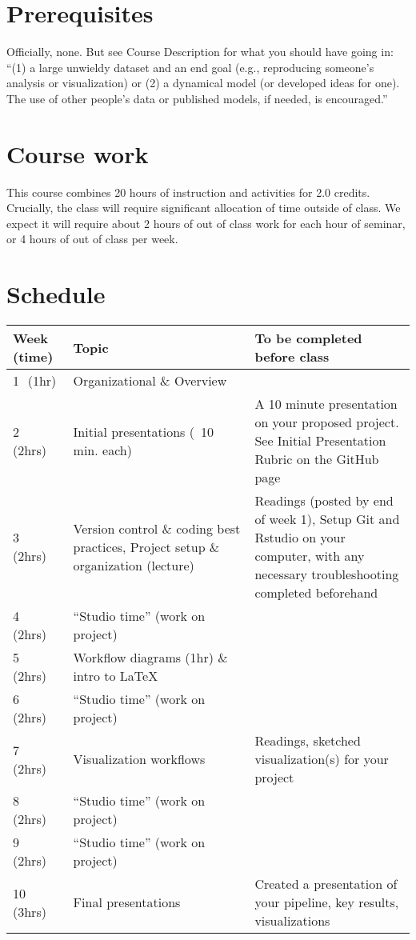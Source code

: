 \documentclass[]{article}
\begin{document}
\section*{Prerequisites}
	Officially, none. But see Course Description for what you should have going in: “(1) a large unwieldy dataset and an end goal (e.g., reproducing someone's analysis or visualization) or (2) a dynamical model (or developed ideas for one). The use of other people's data or published models, if needed, is encouraged.”

\section*{Course work}
	This course combines 20 hours of instruction and activities for 2.0 credits. Crucially, the class will require significant allocation of time outside of class. We expect it will require about 2 hours of out of class work for each hour of seminar, or 4 hours of out of class per week.
	
\section*{Schedule}

\begin{tabular}{p{0.15\linewidth}p{0.45\linewidth}p{0.4\linewidth}} \hline
	Week (time) & Topic & To be completed before class\\ \hline
	
	1  (1hr) & Organizational \& Overview \\
	
	2  (2hrs) &Initial presentations (~10 min. each) & A 10 minute presentation on your proposed project.  See Initial Presentation Rubric on the GitHub page \\
	
	3  (2hrs) & Version control \& coding best practices, Project setup \& organization (lecture) & Readings (posted by end of week 1), Setup Git and Rstudio on your computer, with any necessary troubleshooting completed beforehand \\
	
	4  (2hrs) & ``Studio time'' (work on project) \\
	
	5  (2hrs) & Workflow diagrams (1hr) \&  intro to \LaTeX  \\
	
	6  (2hrs) & ``Studio time'' (work on project) \\
	
	7  (2hrs) & Visualization workflows  & Readings, sketched visualization(s) for your project \\
	
	8  (2hrs) & ``Studio time'' (work on project) \\
	
	9  (2hrs) & ``Studio time'' (work on project) \\
	
	10  (3hrs) & Final presentations & Created a presentation of your pipeline, key results,  visualizations
\end{tabular}
\end{document}
